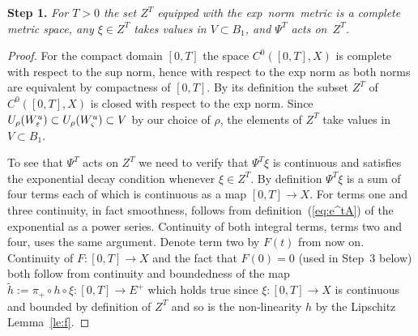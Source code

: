 \documentclass{article}
\begin{document}
\vspace{.2cm}
\noindent
{\bf Step 1.}
{\it For $T>0$ the set $Z^T$ equipped with the exp~norm~metric is a complete
metric space, any  $\xi\in Z^T$ takes values in $V\subset B_1$, and $\Psi^T$ acts on~$Z^T$.
}

\begin{proof}
For the compact domain
$[0,T]$ the space $C^0([0,T],X)$ is complete with respect to the
sup norm, hence with respect to the exp norm as both norms
are equivalent by compactness of $[0,T]$. By its definition the subset $Z^T$
of $C^0([0,T],X)$ is closed with respect to the exp norm. 
Since $U_\rho(W^u_{\varepsilon})\subset U_\rho(W^u_\varsigma)\subset V$
by our choice of $\rho$, the elements of $Z^T$ take values in $V\subset B_1$.

To see that $\Psi^T$ acts on $Z^T$
we need to verify that $\Psi^T\xi$ is continuous
and satisfies the exponential decay condition
whenever $\xi\in Z^T$.
By definition $\Psi^T\xi$ is a sum of four terms
each of which is continuous as a map $[0,T]\to X$.
For terms one and three continuity, in fact
smoothness, follows from definition~(\ref{eq:e^tA})
of the exponential as a power series. Continuity
of both integral terms, terms two and four, uses
the same argument. Denote term two by $F(t)$
from now on. Continuity of $F:[0,T]\to X$ and the
fact that $F(0)=0$ (used in Step~3 below) both
follow from continuity and boundedness of the map
$\tilde{h}:=\pi_+\circ h\circ\xi:[0,T]\to E^+$
which holds true since $\xi:[0,T]\to X$ is
continuous and bounded by definition of $Z^T$
and so is the non-linearity $h$ by the Lipschitz
Lemma~\ref{le:f}.


\end{proof}
\end{document}
